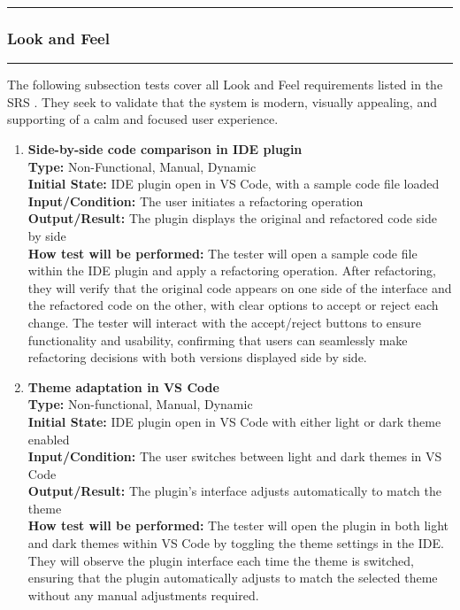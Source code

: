 \documentclass[12pt, titlepage]{article}
\newcommand{\colorrule}{\textcolor{BlueViolet}{\rule{\linewidth}{2pt}}}
\begin{document}
\noindent
\colorrule

\subsubsection{Look and Feel}

\colorrule

\medskip

\noindent
The following subsection tests cover all Look and Feel requirements listed in the SRS \cite{SRS}. They seek to validate that the system is modern, visually appealing, and supporting of a calm and focused user experience. 
		
\begin{enumerate}[label={\bf \textcolor{Maroon}{test-LF-\arabic*}}, wide=0pt, font=\itshape]
  \item \textbf{Side-by-side code comparison in IDE plugin} \\[2mm]
    \textbf{Type:} Non-Functional, Manual, Dynamic \\
    \textbf{Initial State:} IDE plugin open in VS Code, with a sample code file loaded \\
    \textbf{Input/Condition:} The user initiates a refactoring operation \\
    \textbf{Output/Result:} The plugin displays the original and refactored code side by side\\[2mm]
    \textbf{How test will be performed:} The tester will open a sample code file within the IDE plugin and apply a refactoring operation. After refactoring, they will verify that the original code appears on one side of the interface and the refactored code on the other, with clear options to accept or reject each change. The tester will interact with the accept/reject buttons to ensure functionality and usability, confirming that users can seamlessly make refactoring decisions with both versions displayed side by side.

  \item \textbf{Theme adaptation in VS Code} \\[2mm]
    \textbf{Type:} Non-functional, Manual, Dynamic \\
    \textbf{Initial State:} IDE plugin open in VS Code with either light or dark theme enabled \\
    \textbf{Input/Condition:} The user switches between light and dark themes in VS Code \\
    \textbf{Output/Result:} The plugin’s interface adjusts automatically to match the theme \\[2mm]
    \textbf{How test will be performed:} The tester will open the plugin in both light and dark themes within VS Code by toggling the theme settings in the IDE. They will observe the plugin interface each time the theme is switched, ensuring that the plugin automatically adjusts to match the selected theme without any manual adjustments required. 


\end{enumerate}
\end{document}
